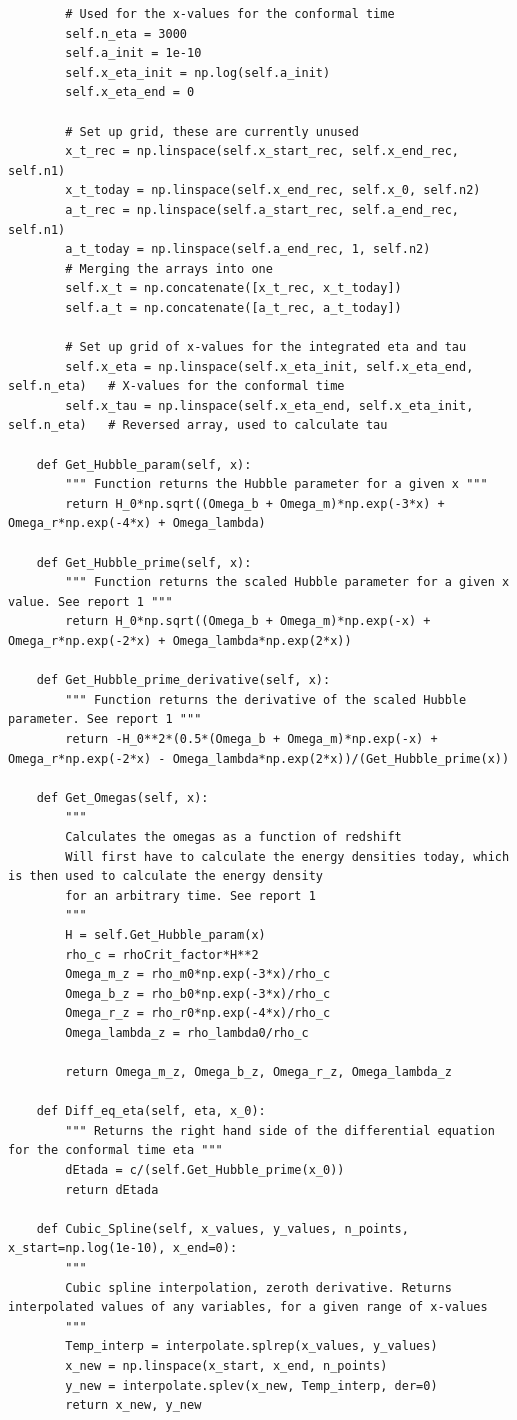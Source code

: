 \documentclass[12pt]{article}
\begin{document}
\begin{lstlisting}
		# Used for the x-values for the conformal time
		self.n_eta = 3000
		self.a_init = 1e-10
		self.x_eta_init = np.log(self.a_init)
		self.x_eta_end = 0

		# Set up grid, these are currently unused
		x_t_rec = np.linspace(self.x_start_rec, self.x_end_rec, self.n1)
		x_t_today = np.linspace(self.x_end_rec, self.x_0, self.n2)
		a_t_rec = np.linspace(self.a_start_rec, self.a_end_rec, self.n1)
		a_t_today = np.linspace(self.a_end_rec, 1, self.n2)
		# Merging the arrays into one
		self.x_t = np.concatenate([x_t_rec, x_t_today])
		self.a_t = np.concatenate([a_t_rec, a_t_today])

		# Set up grid of x-values for the integrated eta and tau
		self.x_eta = np.linspace(self.x_eta_init, self.x_eta_end, self.n_eta)	# X-values for the conformal time
		self.x_tau = np.linspace(self.x_eta_end, self.x_eta_init, self.n_eta)	# Reversed array, used to calculate tau

	def Get_Hubble_param(self, x):
		""" Function returns the Hubble parameter for a given x """
		return H_0*np.sqrt((Omega_b + Omega_m)*np.exp(-3*x) + Omega_r*np.exp(-4*x) + Omega_lambda)

	def Get_Hubble_prime(self, x):
		""" Function returns the scaled Hubble parameter for a given x value. See report 1 """
		return H_0*np.sqrt((Omega_b + Omega_m)*np.exp(-x) + Omega_r*np.exp(-2*x) + Omega_lambda*np.exp(2*x))

	def Get_Hubble_prime_derivative(self, x):
		""" Function returns the derivative of the scaled Hubble parameter. See report 1 """
		return -H_0**2*(0.5*(Omega_b + Omega_m)*np.exp(-x) + Omega_r*np.exp(-2*x) - Omega_lambda*np.exp(2*x))/(Get_Hubble_prime(x))

	def Get_Omegas(self, x):
		""" 
		Calculates the omegas as a function of redshift
		Will first have to calculate the energy densities today, which is then used to calculate the energy density
		for an arbitrary time. See report 1
		"""
		H = self.Get_Hubble_param(x)
		rho_c = rhoCrit_factor*H**2
		Omega_m_z = rho_m0*np.exp(-3*x)/rho_c
		Omega_b_z = rho_b0*np.exp(-3*x)/rho_c
		Omega_r_z = rho_r0*np.exp(-4*x)/rho_c
		Omega_lambda_z = rho_lambda0/rho_c

		return Omega_m_z, Omega_b_z, Omega_r_z, Omega_lambda_z

	def Diff_eq_eta(self, eta, x_0):
		""" Returns the right hand side of the differential equation for the conformal time eta """
		dEtada = c/(self.Get_Hubble_prime(x_0))
		return dEtada

	def Cubic_Spline(self, x_values, y_values, n_points, x_start=np.log(1e-10), x_end=0):
		""" 
		Cubic spline interpolation, zeroth derivative. Returns interpolated values of any variables, for a given range of x-values
		"""
		Temp_interp = interpolate.splrep(x_values, y_values)
		x_new = np.linspace(x_start, x_end, n_points)
		y_new = interpolate.splev(x_new, Temp_interp, der=0)
		return x_new, y_new


\end{lstlisting}
\end{document}

